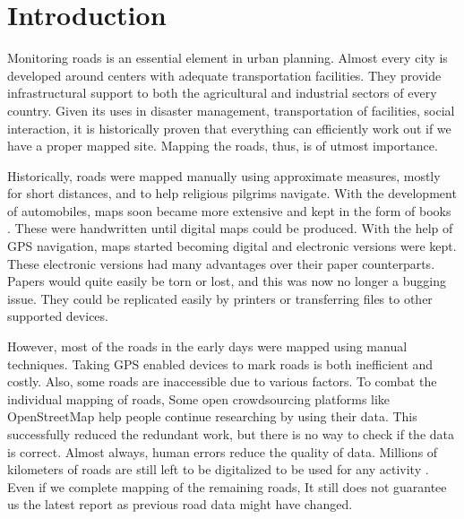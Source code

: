 \chapter{Introduction}\label{chapt:intro}

Monitoring roads is an essential element in urban planning. Almost every city is developed around centers with adequate transportation facilities. They provide infrastructural support to both the agricultural and industrial sectors of every country. Given its uses in disaster management, transportation of facilities, social interaction, it is historically proven that everything can efficiently work out if we have a proper mapped site. Mapping the roads, thus, is of utmost importance.

Historically, roads were mapped manually using approximate measures, mostly for short distances, and to help religious pilgrims navigate. With the development of automobiles, maps soon became more extensive and kept in the form of books \cite{firstMapBooks}. These were handwritten until digital maps could be produced. With the help of GPS navigation, maps started becoming digital and electronic versions were kept. These electronic versions had many advantages over their paper counterparts. Papers would quite easily be torn or lost, and this was now no longer a bugging issue. They could be replicated easily by printers or transferring files to other supported devices.

However, most of the roads in the early days were mapped using manual techniques. Taking GPS enabled devices to mark roads is both inefficient and costly. Also, some roads are inaccessible due to various factors. To combat the individual mapping of roads, Some open crowdsourcing platforms like OpenStreetMap help people continue researching by using their data. This successfully reduced the redundant work, but there is no way to check if the data is correct. Almost always, human errors reduce the quality of data. Millions of kilometers of roads are still left to be digitalized to be used for any activity \cite{MapsDoneOSM}. Even if we complete mapping of the remaining roads, It still does not guarantee us the latest report as previous road data might have changed.

